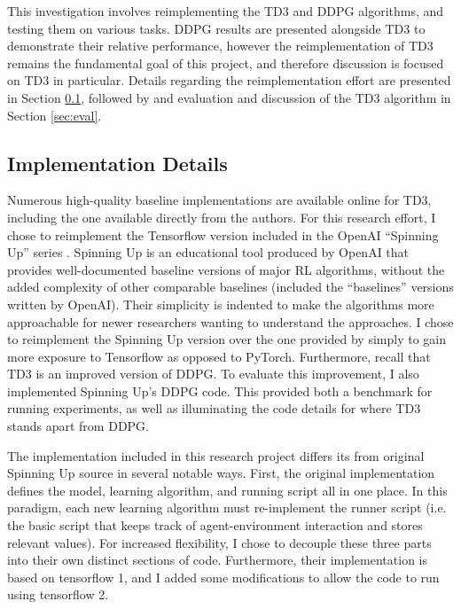 \documentclass{article}
\begin{document}
This investigation involves reimplementing the TD3 and DDPG algorithms, and testing them on various tasks. DDPG results are presented alongside TD3 to demonstrate their relative performance, however the reimplementation of TD3 remains the fundamental goal of this project, and therefore discussion is focused on TD3 in particular. Details regarding the reimplementation effort are presented in Section \ref{sec:implementation}, followed by and evaluation and discussion of the TD3 algorithm in Section \ref{sec:eval}. 

\subsection{Implementation Details} \label{sec:implementation}

Numerous high-quality baseline implementations are available online for TD3, including the one available directly from the authors. For this research effort, I chose to reimplement the Tensorflow version included in the OpenAI ``Spinning Up'' series \cite{SpinningUp2018}. Spinning Up is an educational tool produced by OpenAI that provides well-documented baseline versions of major RL algorithms, without the added complexity of other comparable baselines (included the ``baselines'' versions written by OpenAI). Their simplicity is indented to make the algorithms more approachable for newer researchers wanting to understand the approaches. I chose to reimplement the Spinning Up version over the one provided by \cite{td3} simply to gain more exposure to Tensorflow as opposed to PyTorch. Furthermore, recall that TD3 is an improved version of DDPG. To evaluate this improvement, I also implemented Spinning Up's DDPG code. This provided both a benchmark for running experiments, as well as illuminating the code details for where TD3 stands apart from DDPG.

The implementation included in this research project differs its from original Spinning Up source \cite{SpinningUp2018} in several notable ways. First, the original implementation defines the model, learning algorithm, and running script all in one place. In this paradigm, each new learning algorithm must re-implement the runner script (i.e. the basic script that keeps track of agent-environment interaction and stores relevant values). For increased flexibility, I chose to decouple these three parts into their own distinct sections of code. Furthermore, their implementation is based on tensorflow 1, and I added some modifications to allow the code to run using tensorflow 2.
\end{document}

